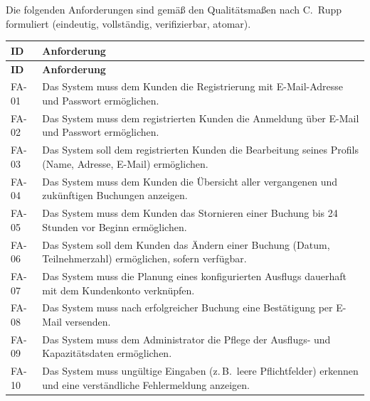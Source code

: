 \documentclass[
	fontsize=12pt,          %
	paper=a4,               %
	numbers=noenddot,       %
	listof=totoc,           %
	listof=entryprefix,     %
	listof=nochaptergap,    %
	bibliography=totoc,     %
	parskip=half,           %
	openany                 %
]{scrbook}
\begin{document}
Die folgenden Anforderungen sind gemäß den Qualitätsmaßen nach C.~Rupp formuliert (eindeutig, vollständig, verifizierbar, atomar).

\begin{longtable}{| p{1.6cm} | p{12cm} |}
	\hline
	\textbf{ID} & \textbf{Anforderung} \\ \hline
	\endfirsthead
	\hline
	\textbf{ID} & \textbf{Anforderung} \\ \hline
	\endhead
	\hline
	\endfoot

	FA-01 & Das System muss dem Kunden die Registrierung mit E-Mail-Adresse und Passwort ermöglichen. \\ \hline
	FA-02 & Das System muss dem registrierten Kunden die Anmeldung über E-Mail und Passwort ermöglichen. \\ \hline
	FA-03 & Das System soll dem registrierten Kunden die Bearbeitung seines Profils (Name, Adresse, E-Mail) ermöglichen. \\ \hline
	FA-04 & Das System muss dem Kunden die Übersicht aller vergangenen und zukünftigen Buchungen anzeigen. \\ \hline
	FA-05 & Das System muss dem Kunden das Stornieren einer Buchung bis 24 Stunden vor Beginn ermöglichen. \\ \hline
	FA-06 & Das System soll dem Kunden das Ändern einer Buchung (Datum, Teilnehmerzahl) ermöglichen, sofern verfügbar. \\ \hline
	FA-07 & Das System muss die Planung eines konfigurierten Ausflugs dauerhaft mit dem Kundenkonto verknüpfen. \\ \hline
	FA-08 & Das System muss nach erfolgreicher Buchung eine Bestätigung per E-Mail versenden. \\ \hline
	FA-09 & Das System muss dem Administrator die Pflege der Ausflugs- und Kapazitätsdaten ermöglichen. \\ \hline
	FA-10 & Das System muss ungültige Eingaben (z.\,B.\ leere Pflichtfelder) erkennen und eine verständliche Fehlermeldung anzeigen. \\ \hline
\end{longtable}


\end{document}
